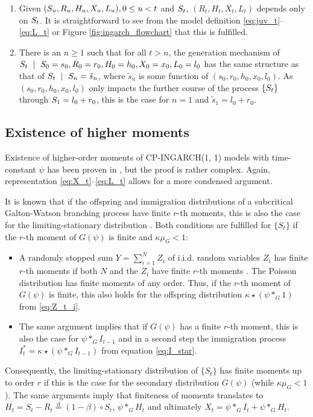 \documentclass[review]{elsarticle}
\begin{document}
\begin{enumerate}
\item Given $(S_u, R_u, H_u, X_u, L_u), 0 \leq u < t$ and $S_t$, $(R_t, H_t, X_t, L_t)$ depends only on $S_t$. It is straightforward to see from the model definition \eqref{eq:juv_t}--\eqref{eq:L_t} or Figure \ref{fig:ingarch_flowchart} that this is fulfilled.
\item There is an $n \geq 1$ such that for all $t > n$, the generation mechanism of $\juv_t \ \mid \ \juv_0 = s_0, R_0 = r_0, H_0 = h_0, X_0 = x_0, L_0 = l_0$ has the same structure as that of $\juv_t \ \mid \ \juv_n = \tilde{s}_n$, where $\tilde{s}_n$ is some function of $(s_0, r_0, h_0, x_0, l_0)$. As $(s_0, r_0, h_0, x_0, l_0)$ only impacts the further course of the process $\{S_t\}$ through $S_1 = l_0 + r_0$, this is the case for $n = 1$ and $\tilde{s}_1 = l_0 + r_0$.
\end{enumerate}

\subsection{Existence of higher moments}

Existence of higher-order moments of CP-INGARCH(1, 1) models with time-constant $\psi$ has been proven in \cite{Silva2016}, but the proof is rather complex. Again, representation \eqref{eq:X_t}--\eqref{eq:L_t} allows for a more condensed argument.

It is known that if the offspring and immigration distributions of a subcritical Galton-Watson branching process have finite $r$-th moments, this is also the case for the limiting-stationary distribution \cite[Sec. 4]{Lange1981}. Both conditions are fulfilled for $\{S_t\}$ if the $r$-th moment of $G(\psi)$ is finite and $\kappa\mu_G < 1$:

\begin{itemize}
\item A randomly stopped sum $Y = \sum_{i = 1}^N Z_i$ of i.i.d. random variables $Z_i$ has finite $r$-th moments if both $N$ and the $Z_i$ have finite $r$-th moments \cite[Theorem 5.2]{Gut2009}. The Poisson distribution has finite moments of any order. Thus, if the $r$-th moment of $G(\psi)$ is finite, this also holds for the offspring distribution $\kappa \star (\psi *_G 1)$ from \eqref{eq:Z_t_i}.
\item The same argument implies that if $G(\psi)$ has a finite $r$-th moment, this is also the case for $\psi *_G I_{t - 1}$ and in a second step the immigration process $I^*_t = \kappa \star(\psi *_G I_{t - 1})$ from equation \eqref{eq:I_star}.
\end{itemize}
Consequently, the limiting-stationary distribution of $\{S_t\}$ has finite moments up to order $r$ if this is the case for the secondary distribution $G(\psi)$ (while $\kappa\mu_G < 1$). The same arguments imply that finiteness of moments translates to $H_t = S_t - R_t \stackrel{\text{d}}{=} (1 - \beta) \circ S_t$, $\psi *_G H_t$ and ultimately $X_t = \psi *_G I_t + \psi *_G H_t$.
\end{document}
